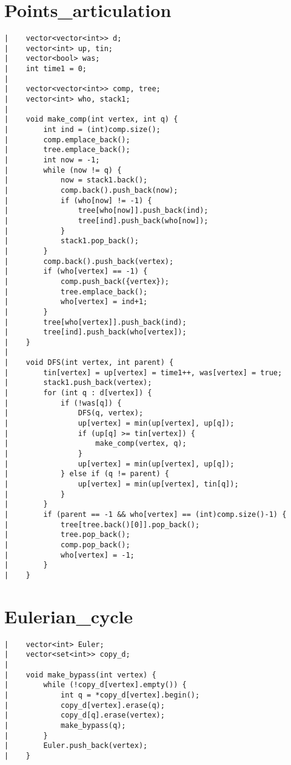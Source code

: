 \documentclass[a4paper, 10pt]{article}
\begin{document}
\begin{center}
\section*{Points\_articulation}
\begin{verbatim}
|    vector<vector<int>> d;
|    vector<int> up, tin;
|    vector<bool> was;
|    int time1 = 0;
|    
|    vector<vector<int>> comp, tree;
|    vector<int> who, stack1;
|    
|    void make_comp(int vertex, int q) {
|        int ind = (int)comp.size();
|        comp.emplace_back();
|        tree.emplace_back();
|        int now = -1;
|        while (now != q) {
|            now = stack1.back();
|            comp.back().push_back(now);
|            if (who[now] != -1) {
|                tree[who[now]].push_back(ind);
|                tree[ind].push_back(who[now]);
|            }
|            stack1.pop_back();
|        }
|        comp.back().push_back(vertex);
|        if (who[vertex] == -1) {
|            comp.push_back({vertex});
|            tree.emplace_back();
|            who[vertex] = ind+1;
|        }
|        tree[who[vertex]].push_back(ind);
|        tree[ind].push_back(who[vertex]);
|    }
|    
|    void DFS(int vertex, int parent) {
|        tin[vertex] = up[vertex] = time1++, was[vertex] = true;
|        stack1.push_back(vertex);
|        for (int q : d[vertex]) {
|            if (!was[q]) {
|                DFS(q, vertex);
|                up[vertex] = min(up[vertex], up[q]);
|                if (up[q] >= tin[vertex]) {
|                    make_comp(vertex, q);
|                }
|                up[vertex] = min(up[vertex], up[q]);
|            } else if (q != parent) {
|                up[vertex] = min(up[vertex], tin[q]);
|            }
|        }
|        if (parent == -1 && who[vertex] == (int)comp.size()-1) {
|            tree[tree.back()[0]].pop_back();
|            tree.pop_back();
|            comp.pop_back();
|            who[vertex] = -1;
|        }
|    }
\end{verbatim}

\section*{Eulerian\_cycle}
\begin{verbatim}
|    vector<int> Euler;
|    vector<set<int>> copy_d;
|    
|    void make_bypass(int vertex) {
|        while (!copy_d[vertex].empty()) {
|            int q = *copy_d[vertex].begin();
|            copy_d[vertex].erase(q);
|            copy_d[q].erase(vertex);
|            make_bypass(q);
|        }
|        Euler.push_back(vertex);
|    }
\end{verbatim}


\end{center}
\end{document}
